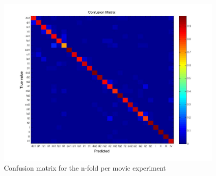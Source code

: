\begin{figure}[tb]
	\centering{}
	\includegraphics[width=0.8\linewidth]{confmat/confusion.jpg}
	\caption{Confusion matrix for the n-fold per movie experiment}
	\label{fig:confusion}
\end{figure}

